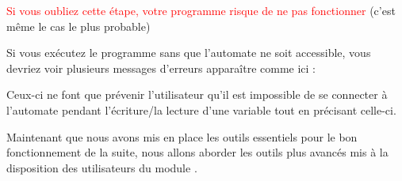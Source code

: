 \documentclass[12pt]{report}    %
\begin{document}
\textcolor{red}{Si vous oubliez cette étape, votre programme risque de ne pas fonctionner} (c'est même le cas le plus probable)


Si vous exécutez le programme sans que l'automate ne soit accessible, vous devriez voir plusieurs messages d'erreurs apparaître comme ici :


Ceux-ci ne font que prévenir l'utilisateur qu'il est impossible de se connecter à l'automate pendant l'écriture/la lecture d'une variable tout en précisant celle-ci.
\smallSkip

Maintenant que nous avons mis en place les outils essentiels pour le bon fonctionnement de la suite, nous allons aborder les outils plus avancés mis à la disposition des utilisateurs du module .\smallSkip
\end{document}
